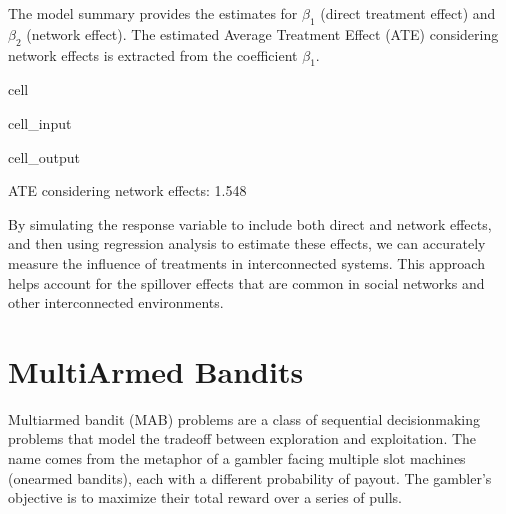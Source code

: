 \documentclass[letterpaper,10pt,english]{jupyterBook}
\begin{document}
\sphinxAtStartPar
The model summary provides the estimates for \(\beta_1\) (direct treatment effect) and \(\beta_2\) (network effect).
The estimated Average Treatment Effect (ATE) considering network effects is extracted from the coefficient \(\beta_1\).

\begin{sphinxuseclass}{cell}\begin{sphinxVerbatimInput}

\begin{sphinxuseclass}{cell_input}
\begin{sphinxVerbatim}[commandchars=\\\{\}]
  \PYG{p}{[}\PYG{p}{]}  
\end{sphinxVerbatim}

\end{sphinxuseclass}\end{sphinxVerbatimInput}
\begin{sphinxVerbatimOutput}

\begin{sphinxuseclass}{cell_output}
\begin{sphinxVerbatim}[commandchars=\\\{\}]
ATE considering network effects: 1.548
\end{sphinxVerbatim}

\end{sphinxuseclass}\end{sphinxVerbatimOutput}

\end{sphinxuseclass}
\sphinxAtStartPar
By simulating the response variable to include both direct and network effects, and then using regression analysis to estimate these effects, we can accurately measure the influence of treatments in interconnected systems. This approach helps account for the spillover effects that are common in social networks and other interconnected environments.

\sphinxstepscope


\chapter{Multi\sphinxhyphen{}Armed Bandits}
\label{\detokenize{notebooks/bandits:multi-armed-bandits}}\label{\detokenize{notebooks/bandits::doc}}
\sphinxAtStartPar
Multi\sphinxhyphen{}armed bandit (MAB) problems are a class of sequential decision\sphinxhyphen{}making problems that model the trade\sphinxhyphen{}off between exploration and exploitation. The name comes from the metaphor of a gambler facing multiple slot machines (one\sphinxhyphen{}armed bandits), each with a different probability of payout. The gambler’s objective is to maximize their total reward over a series of pulls.
\end{document}
